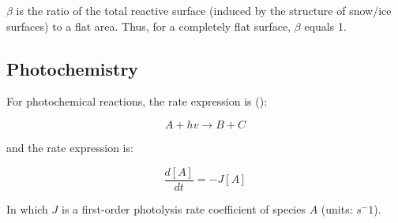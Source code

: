 \medskip

$\beta$ is the ratio of the total reactive surface (induced by the structure of snow/ice surfaces) to a flat area. Thus, for a completely flat surface, $\beta$ equals 1. 





\subsection{Photochemistry}

For photochemical reactions, the rate expression is (\cite{AtmModFund}):

\begin{equation*}
    A + hv \rightarrow B + C
\end{equation*}

and the rate expression is: 

\begin{equation*}
    \frac{d[A]}{dt} = -J[A]
\end{equation*}

In which $J$ is a first-order photolysis rate coefficient of species $A$ (units: $s^-1$). 
